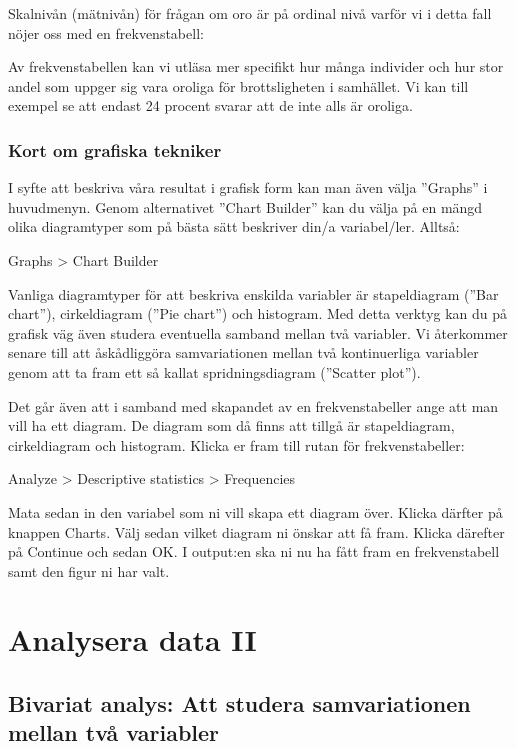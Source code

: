 \documentclass[
]{book}
\begin{document}
Skalnivån (mätnivån) för frågan om oro är på ordinal nivå varför vi i detta fall nöjer oss med en
frekvenstabell:

Av frekvenstabellen kan vi utläsa mer specifikt hur många individer och hur stor andel som uppger sig
vara oroliga för brottsligheten i samhället. Vi kan till exempel se att endast 24 procent svarar att de
inte alls är oroliga.

\hypertarget{kort-om-grafiska-tekniker}{%
\section{Kort om grafiska tekniker}\label{kort-om-grafiska-tekniker}}

I syfte att beskriva våra resultat i grafisk form kan man även välja ''Graphs'' i huvudmenyn. Genom
alternativet ''Chart Builder'' kan du välja på en mängd olika diagramtyper som på bästa sätt beskriver
din/a variabel/ler. Alltså:

Graphs \textgreater{} Chart Builder

Vanliga diagramtyper för att beskriva enskilda variabler är stapeldiagram (''Bar chart''), cirkeldiagram
(''Pie chart'') och histogram. Med detta verktyg kan du på grafisk väg även studera eventuella samband
mellan två variabler. Vi återkommer senare till att åskådliggöra samvariationen mellan två kontinuerliga
variabler genom att ta fram ett så kallat spridningsdiagram (''Scatter plot'').

Det går även att i samband med skapandet av en frekvenstabeller ange att man vill ha ett diagram. De diagram som då finns att tillgå är stapeldiagram, cirkeldiagram och histogram. Klicka er fram till rutan för frekvenstabeller:

Analyze \textgreater{} Descriptive statistics \textgreater{} Frequencies

Mata sedan in den variabel som ni vill skapa ett diagram över. Klicka därfter på knappen Charts. Välj sedan vilket diagram ni önskar att få fram. Klicka därefter på Continue och sedan OK. I output:en ska ni nu ha fått fram en frekvenstabell samt den figur ni har valt.

\hypertarget{part-analysera-data-ii}{%
\part*{Analysera data II}\label{part-analysera-data-ii}}

\hypertarget{bivariat-analys-att-studera-samvariationen-mellan-tvuxe5-variabler}{%
\chapter{Bivariat analys: Att studera samvariationen mellan två variabler}\label{bivariat-analys-att-studera-samvariationen-mellan-tvuxe5-variabler}}
\end{document}
